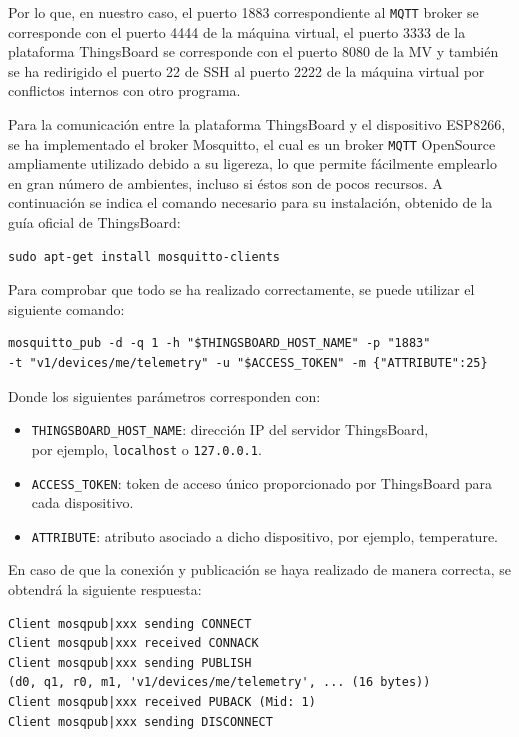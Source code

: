 Por lo que, en nuestro caso, el puerto 1883 correspondiente al \texttt{MQTT} broker se corresponde con el puerto 4444 de la máquina virtual, el puerto 3333 de la plataforma ThingsBoard se corresponde con el puerto 8080 de la MV y también se ha redirigido el puerto 22 de SSH al puerto 2222 de la máquina virtual por conflictos internos con otro programa.

Para la comunicación entre la plataforma ThingsBoard y el dispositivo ESP8266, se ha implementado el broker Mosquitto, el cual es un broker \texttt{MQTT} OpenSource ampliamente utilizado debido a su ligereza, lo que permite fácilmente emplearlo en gran número de ambientes, incluso si éstos son de pocos recursos. A continuación se indica el comando necesario para su instalación, obtenido de la guía oficial de ThingsBoard: \cite{thingsboardMQTTDeviceAPI}

\begin{verbatim}
sudo apt-get install mosquitto-clients
\end{verbatim}

Para comprobar que todo se ha realizado correctamente, se puede utilizar el siguiente comando:
\begin{verbatim}
mosquitto_pub -d -q 1 -h "$THINGSBOARD_HOST_NAME" -p "1883"
-t "v1/devices/me/telemetry" -u "$ACCESS_TOKEN" -m {"ATTRIBUTE":25}
\end{verbatim}

Donde los siguientes parámetros corresponden con:
\begin{itemize}
    \item \texttt{THINGSBOARD\_HOST\_NAME}: dirección IP del servidor ThingsBoard, \\
    por ejemplo, \texttt{localhost} o \texttt{127.0.0.1}.
    \item \texttt{ACCESS\_TOKEN}: token de acceso único proporcionado por ThingsBoard para cada dispositivo.
    \item \texttt{ATTRIBUTE}: atributo asociado a dicho dispositivo, por ejemplo, temperature.
\end{itemize}

En caso de que la conexión y publicación se haya realizado de manera correcta, se obtendrá la siguiente respuesta:
\begin{verbatim}
Client mosqpub|xxx sending CONNECT
Client mosqpub|xxx received CONNACK
Client mosqpub|xxx sending PUBLISH
(d0, q1, r0, m1, 'v1/devices/me/telemetry', ... (16 bytes))
Client mosqpub|xxx received PUBACK (Mid: 1)
Client mosqpub|xxx sending DISCONNECT
\end{verbatim}

